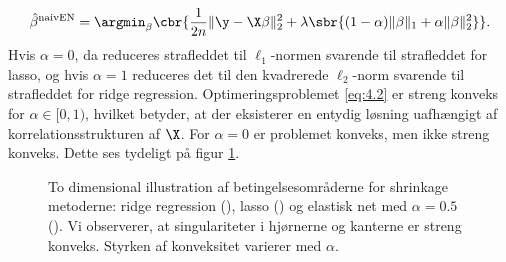 \begin{align}
\hat{\beta}^\text{naivEN} =\argmin_{\beta} \cbr{\frac{1}{2n} \Vert \y - \X \beta \Vert_2^2 + \lambda \sbr{(1- \alpha) \Vert \beta \Vert_1 + \alpha \Vert \beta \Vert_2^2}}. \label{eq:4.2}
\end{align}
Hvis $\alpha=0$, da reduceres strafleddet til $\ell_1$-normen svarende til strafleddet for lasso, og hvis $\alpha=1$ reduceres det til den kvadrerede $\ell_2$-norm svarende til strafleddet for ridge regression.
Optimeringsproblemet  \eqref{eq:4.2} er streng konveks for \(\alpha \in [0,1)\), hvilket betyder, at der eksisterer en entydig løsning uafhængigt af korrelationsstrukturen af $\X$.
For  \(\alpha=0\) er problemet konveks, men ikke streng konveks.
Dette ses tydeligt på figur \ref{fig:elastisk}.
%
\begin{figure}[H]
\centering
\scalebox{0.8}{}
\caption[optional short text]{To dimensional illustration af betingelsesområderne for shrinkage metoderne: ridge regression (), lasso () og elastisk net med \(\alpha = 0.5\) (). Vi observerer, at singulariteter i hjørnerne og kanterne er streng konveks. Styrken af konveksitet varierer med \(\alpha\).} \label{fig:elastisk}
\end{figure}
%



